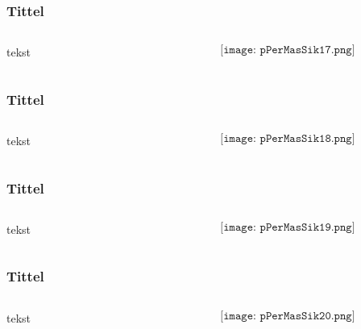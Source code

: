 \documentclass[aspectratio=169,xcolor=dvipsnames]{beamer}
\begin{document}
\begin{frame}
	\frametitle{Tittel}
	\begin{columns}
		\begin{column}{0.5\textwidth}
tekst
			
		\end{column}

		\begin{column}{0.5\textwidth}
	$$\texttt{[image: pPerMasSik17.png]}$$
		\end{column}
	\end{columns}
\end{frame}

\begin{frame}
	\frametitle{Tittel}
	\begin{columns}
		\begin{column}{0.5\textwidth}
tekst
			
		\end{column}

		\begin{column}{0.5\textwidth}
	$$\texttt{[image: pPerMasSik18.png]}$$
		\end{column}
	\end{columns}
\end{frame}

\begin{frame}
	\frametitle{Tittel}
	\begin{columns}
		\begin{column}{0.5\textwidth}
tekst
			
		\end{column}

		\begin{column}{0.5\textwidth}
	$$\texttt{[image: pPerMasSik19.png]}$$
		\end{column}
	\end{columns}
\end{frame}

\begin{frame}
	\frametitle{Tittel}
	\begin{columns}
		\begin{column}{0.5\textwidth}
tekst
			
		\end{column}

		\begin{column}{0.5\textwidth}
	$$\texttt{[image: pPerMasSik20.png]}$$
		\end{column}
	\end{columns}
\end{frame}
\end{document}
